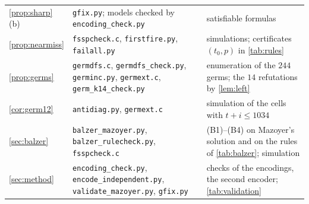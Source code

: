 \begin{table}[ht]
\begin{tabular}{@{}l>{\raggedright\arraybackslash}p{}lrrll@{}}
\ref{prop:sharp}\,(b) & \texttt{gfix.py}; models checked by \texttt{encoding\_check.py} & \multicolumn{5}{l}{satisfiable formulas}\\
\ref{prop:nearmiss} & \texttt{fsspcheck.c}, \texttt{firstfire.py}, \texttt{failall.py} & \multicolumn{5}{l}{simulations; certificates $(t_0,p)$ in \cref{tab:rules}}\\
\ref{prop:germs} & \texttt{germdfs.c}, \texttt{germdfs\_check.py}, \texttt{germinc.py}, \texttt{germext.c}, \texttt{germ\_k14\_check.py} & \multicolumn{5}{l}{enumeration of the $244$ germs; the $14$ refutations by \cref{lem:left}}\\
\ref{cor:germ12} & \texttt{antidiag.py}, \texttt{germext.c} & \multicolumn{5}{l}{simulation of the cells with $t+i\le1034$}\\
\ref{sec:balzer} & \texttt{balzer\_mazoyer.py}, \texttt{balzer\_rulecheck.py}, \texttt{fsspcheck.c} & \multicolumn{5}{l}{(B1)--(B4) on Mazoyer's solution and on the rules of \cref{tab:balzer}; simulation}\\
\ref{sec:method} & \texttt{encoding\_check.py}, \texttt{encode\_\allowbreak independent.py}, \texttt{validate\_mazoyer.py}, \texttt{gfix.py} & \multicolumn{5}{l}{checks of the encodings, the second encoder; \cref{tab:validation}}\\
\bottomrule
\end{tabular}
\end{table}
